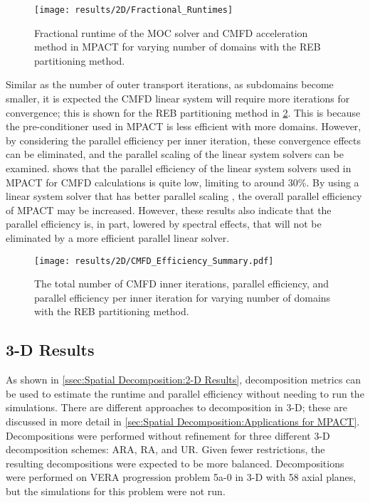 {{{{        \begin{figure}
          \centering
          \texttt{[image: results/2D/Fractional\_Runtimes]}
          \caption{Fractional runtime of the \ac{MOC} solver and \ac{CMFD} acceleration method in MPACT for varying number of domains with the \ac{REB} partitioning method. \label{fig:Spatial Decomposition:Fractional Runtimes}}
        \end{figure}

        Similar as the number of outer transport iterations, as subdomains become smaller, it is expected the \ac{CMFD} linear system will require more iterations for convergence; this is shown for the \ac{REB} partitioning method in \cref{fig:Spatial Decomposition:CMFD Efficiency Summary}.
        This is because the pre-conditioner used in MPACT is less efficient with more domains.
        However, by considering the parallel efficiency per inner iteration, these convergence effects can be eliminated, and the parallel scaling of the linear system solvers can be examined.
         shows that the parallel efficiency of the linear system solvers used in MPACT for \ac{CMFD} calculations is quite low, limiting to around 30\%.
        By using a linear system solver that has better parallel scaling \cite{Hao2018}, the overall parallel efficiency of MPACT may be increased.
        However, these results also indicate that the parallel efficiency is, in part, lowered by spectral effects, that will not be eliminated by a more efficient parallel linear solver.

        \begin{figure}
          \centering
          \texttt{[image: results/2D/CMFD\_Efficiency\_Summary.pdf]}
          \caption{The total number of \ac{CMFD} inner iterations, parallel efficiency, and parallel efficiency per inner iteration for varying number of domains with the \ac{REB} partitioning method. \label{fig:Spatial Decomposition:CMFD Efficiency Summary}}
        \end{figure}
      }
    }
    \subsection{3-D Results}{\label{ssec:Spatial Decomposition:3-D Results}
      As shown in \cref{ssec:Spatial Decomposition:2-D Results}, decomposition metrics can be used to estimate the runtime and parallel efficiency without needing to run the simulations.
      There are different approaches to decomposition in 3-D; these are discussed in more detail in \cref{sec:Spatial Decomposition:Applications for MPACT}.
      Decompositions were performed without refinement for three different 3-D decomposition schemes:  \ac{ARA}, \ac{RA}, and \ac{UR}.
      Given fewer restrictions, the resulting decompositions were expected to be more balanced.
      Decompositions were performed on VERA progression problem 5a-0 in 3-D \cite{VERAProblems} with 58 axial planes, but the simulations for this problem were not run.

}}}
